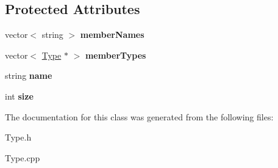 \subsection*{Protected Attributes}
\begin{DoxyCompactItemize}
\item 
\hypertarget{classUnionType_ac1563d21c72e434e98862244ab2bedb7}{vector$<$ string $>$ {\bfseries member\-Names}}\label{classUnionType_ac1563d21c72e434e98862244ab2bedb7}

\item 
\hypertarget{classUnionType_aacb3255f59d079d6d94374b7f4f62b72}{vector$<$ \hyperlink{classType}{Type} $\ast$ $>$ {\bfseries member\-Types}}\label{classUnionType_aacb3255f59d079d6d94374b7f4f62b72}

\item 
\hypertarget{classType_ad7eeefba3dfcecbdaa98d46aaa84e389}{string {\bfseries name}}\label{classType_ad7eeefba3dfcecbdaa98d46aaa84e389}

\item 
\hypertarget{classType_a871302dc63ac1a37c0b6a225cf82048d}{int {\bfseries size}}\label{classType_a871302dc63ac1a37c0b6a225cf82048d}

\end{DoxyCompactItemize}


The documentation for this class was generated from the following files\-:\begin{DoxyCompactItemize}
\item 
Type.\-h\item 
Type.\-cpp\end{DoxyCompactItemize}
